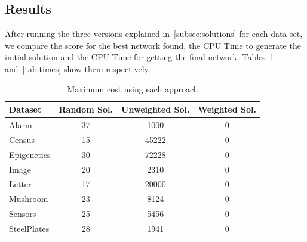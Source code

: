 \subsection{Results}
\label{subsec:results}
	After running the three versions explained in~\ref{subsec:solutions} for each data set, we compare the score for the best network found, the CPU Time to generate the initial solution and the CPU Time for getting the final network. Tables~\ref{tab:costs} and~\ref{tab:times} show them respectively.
	\begin{table}[ h ]
		\centering
		\begin{tabular}{ | l | c | c | c | }
			\hline
			Dataset & Random Sol. & Unweighted Sol. & Weighted Sol.\\ \hline
			Alarm & 37 & 1000 & 0 \\ \hline
			Census & 15 & 45222 & 0 \\ \hline
			Epigenetics & 30 & 72228 & 0 \\ \hline
			Image & 20 & 2310 & 0 \\ \hline
			Letter & 17 & 20000 & 0 \\ \hline
			Mushroom & 23 & 8124 & 0 \\ \hline
			Sensors & 25 & 5456 & 0 \\ \hline
			SteelPlates & 28 & 1941 & 0 \\ \hline
		\end{tabular}
		\caption{Maximum cost using each approach}
		\label{tab:costs}
	\end{table}
	
